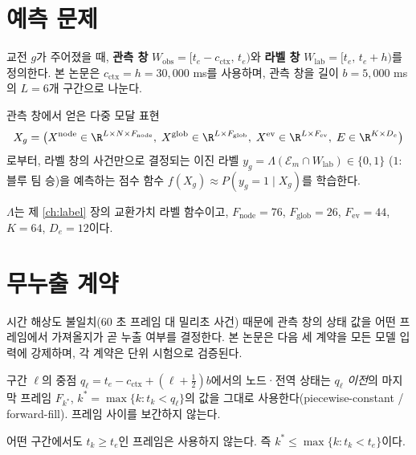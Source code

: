 \section{예측 문제}
\label{sec:problem-prediction}

교전 $g$가 주어졌을 때, \textbf{관측 창} $W_{\mathrm{obs}} = [t_e - c_{\mathrm{ctx}},\, t_e)$와 \textbf{라벨 창} $W_{\mathrm{lab}} = [t_e,\, t_e + h)$를 정의한다. 본 논문은 $c_{\mathrm{ctx}} = h = 30{,}000$ ms를 사용하며, 관측 창을 길이 $b = 5{,}000$ ms의 $L = 6$개 구간으로 나눈다.

\begin{definition}[교전 결과 예측 문제]
관측 창에서 얻은 다중 모달 표현
\begin{equation}
  X_g = \big(X^{\mathrm{node}} \in \R^{L\times N\times F_{\mathrm{node}}},\; X^{\mathrm{glob}} \in \R^{L\times F_{\mathrm{glob}}},\; X^{\mathrm{ev}} \in \R^{L\times F_{\mathrm{ev}}},\; E \in \R^{K\times D_e}\big)
\end{equation}
로부터, 라벨 창의 사건만으로 결정되는 이진 라벨 $y_g = \Lambda(\mathcal{E}_m \cap W_{\mathrm{lab}}) \in \{0,1\}$ ($1$: 블루 팀 승)을 예측하는 점수 함수 $f(X_g) \approx P(y_g = 1 \mid X_g)$를 학습한다.
\end{definition}

$\Lambda$는 제 \ref{ch:label} 장의 교환가치 라벨 함수이고, $F_{\mathrm{node}} = 76$, $F_{\mathrm{glob}} = 26$, $F_{\mathrm{ev}} = 44$, $K = 64$, $D_e = 12$이다.

\section{무누출 계약}
\label{sec:problem-contract}

시간 해상도 불일치(60 초 프레임 대 밀리초 사건) 때문에 관측 창의 상태 값을 어떤 프레임에서 가져올지가 곧 누출 여부를 결정한다. 본 논문은 다음 세 계약을 모든 모델 입력에 강제하며, 각 계약은 단위 시험으로 검증된다.

\begin{assumption}[계단 유지 계약]
\label{asm:stephold}
구간 $\ell$의 중점 $q_\ell = t_e - c_{\mathrm{ctx}} + (\ell + \tfrac12) b$에서의 노드·전역 상태는 $q_\ell$ \emph{이전}의 마지막 프레임 $F_{k^*}$, $k^* = \max\{k : t_k < q_\ell\}$의 값을 그대로 사용한다(piecewise-constant / forward-fill). 프레임 사이를 보간하지 않는다.
\end{assumption}

\begin{assumption}[온셋 상한 계약]
\label{asm:onsetcap}
어떤 구간에서도 $t_k \ge t_e$인 프레임은 사용하지 않는다. 즉 $k^* \le \max\{k : t_k < t_e\}$이다.
\end{assumption}


